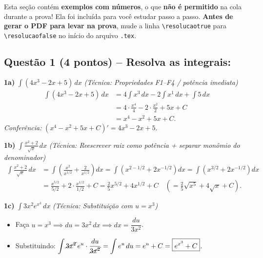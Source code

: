 \documentclass[10pt,a4paper]{article}
\newif\ifresolucao
\begin{document}
\begin{cuidado}
    Esta seção contém \textbf{exemplos com números}, o que \textbf{não é permitido} na cola durante a prova!
    Ela foi incluída para você estudar passo a passo. \textbf{Antes de gerar o PDF para levar na prova}, mude a linha \verb|\resolucaotrue| para \verb|\resolucaofalse| no início do arquivo \texttt{.tex}.
\end{cuidado}

\subsection*{Questão 1 (4 pontos) -- Resolva as integrais:}

\textbf{1a)} $\displaystyle \int (4x^3 - 2x + 5)\,dx$ \quad \textit{(Técnica: Propriedades F1--F4 / potência imediata)}
\begin{align*}
    \int (4x^3 - 2x + 5)\,dx &= 4\int x^3\,dx - 2\int x^1\,dx + \int 5\,dx \\
    &= 4\cdot\frac{x^4}{4} - 2\cdot\frac{x^2}{2} + 5x + C \\
    &= \boxed{x^4 - x^2 + 5x + C}.
\end{align*}
\textit{Conferência:} $(x^4 - x^2 + 5x + C)' = 4x^3 - 2x + 5$. \checkmark

\medskip
\textbf{1b)} $\displaystyle \int \frac{x^2 + 2}{\sqrt{x}}\,dx$ \quad \textit{(Técnica: Reescrever raiz como potência + separar monômio do denominador)}
\begin{align*}
    \int \frac{x^2 + 2}{\sqrt{x}}\,dx &= \int \left(\frac{x^2}{x^{1/2}} + \frac{2}{x^{1/2}}\right)dx = \int \left(x^{2 - 1/2} + 2x^{-1/2}\right)dx = \int \left(x^{3/2} + 2x^{-1/2}\right)dx \\
    &= \frac{x^{5/2}}{5/2} + 2\cdot\frac{x^{1/2}}{1/2} + C = \boxed{\frac{2}{5}x^{5/2} + 4x^{1/2} + C} \quad \left(= \frac{2}{5}\sqrt{x^5} + 4\sqrt{x} + C\right).
\end{align*}

\medskip
\textbf{1c)} $\displaystyle \int 3x^2 e^{x^3}\,dx$ \quad \textit{(Técnica: Substituição com $u = x^3$)}
\begin{itemize}
    \item Faça $u = x^3 \implies du = 3x^2\,dx \implies dx = \dfrac{du}{3x^2}$.
    \item Substituindo: $\displaystyle \int \cancel{3x^2}\,e^u \cdot \frac{du}{\cancel{3x^2}} = \int e^u\,du = e^u + C = \boxed{e^{x^3} + C}$.
\end{itemize}
\end{document}
